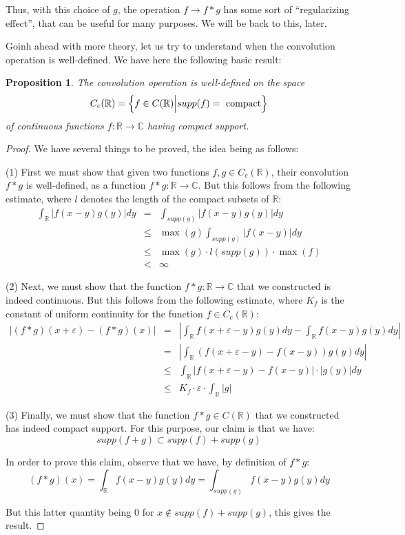 \documentclass[12pt]{amsbook}
\newtheorem{proposition}[theorem]{Proposition}
\begin{document}
Thus, with this choice of $g$, the operation $f\to f*g$ has some sort of ``regularizing effect'', that can be useful for many purposes. We will be back to this, later.

\bigskip

Goinh ahead with more theory, let us try to understand when the convolution operation is well-defined. We have here the following basic result:


\begin{proposition}
The convolution operation is well-defined on the space
$$C_c(\mathbb R)=\left\{f\in C(\mathbb R)\Big|supp(f)=\ {\rm compact}\right\}$$
of continuous functions $f:\mathbb R\to\mathbb C$ having compact support.
\end{proposition}

\begin{proof}
We have several things to be proved, the idea being as follows:

\medskip

(1) First we must show that given two functions $f,g\in C_c(\mathbb R)$, their convolution $f*g$ is well-defined, as a function $f*g:\mathbb R\to\mathbb C$. But this follows from the following estimate, where $l$ denotes the length of the compact subsets of $\mathbb R$:
\begin{eqnarray*}
\int_\mathbb R|f(x-y)g(y)|dy
&=&\int_{supp(g)}|f(x-y)g(y)|dy\\
&\leq&\max(g)\int_{supp(g)}|f(x-y)|dy\\
&\leq&\max(g)\cdot l(supp(g))\cdot\max(f)\\
&<&\infty
\end{eqnarray*}

(2) Next, we must show that the function $f*g:\mathbb R\to\mathbb C$ that we constructed is indeed continuous. But this follows from the following estimate, where $K_f$ is the constant of uniform continuity for the function $f\in C_c(\mathbb R)$:
\begin{eqnarray*}
|(f*g)(x+\varepsilon)-(f*g)(x)|
&=&\left|\int_\mathbb R f(x+\varepsilon-y)g(y)dy-\int_\mathbb R f(x-y)g(y)dy\right|\\
&=&\left|\int_\mathbb R\left(f(x+\varepsilon-y)-f(x-y)\right)g(y)dy\right|\\
&\leq&\int_\mathbb R|f(x+\varepsilon-y)-f(x-y)|\cdot|g(y)|dy\\
&\leq&K_f\cdot\varepsilon\cdot\int_\mathbb R|g|
\end{eqnarray*}

(3) Finally, we must show that the function $f*g\in C(\mathbb R)$ that we constructed has indeed compact support. For this purpose, our claim is that we have:
$$supp(f+g)\subset supp(f)+supp(g)$$

In order to prove this claim, observe that we have, by definition of $f*g$:
$$(f*g)(x)
=\int_\mathbb R f(x-y)g(y)dy
=\int_{supp(g)}f(x-y)g(y)dy$$

But this latter quantity being 0 for $x\notin supp(f)+supp(g)$, this gives the result.
\end{proof}
\end{document}

